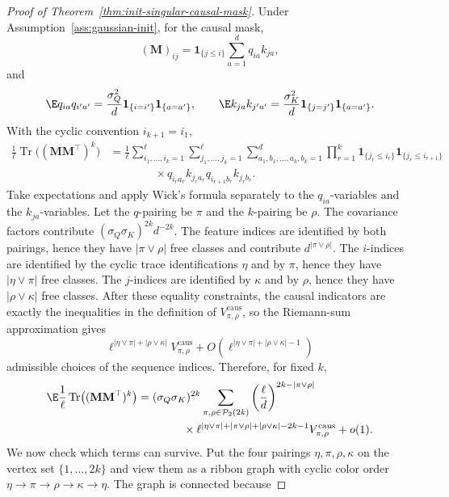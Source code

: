 \documentclass{article}
\newcommand{\one}{\mathbf{1}}
\newcommand{\bM}{\mathbf{M}}
\theoremstyle{definition}
\theoremstyle{remark}
\begin{document}
\begin{proof}[Proof of Theorem~\ref{thm:init-singular-causal-mask}]
Under Assumption~\ref{ass:gaussian-init}, for the causal mask,
\[
    (\bM)_{ij}
    =
    \one_{\{j\leq i\}}\sum_{a=1}^d q_{ia}k_{ja},
\]
and
\[
    \E q_{ia}q_{i'a'}
    =
    \frac{\sigma_Q^2}{d}\one_{\{i=i'\}}\one_{\{a=a'\}},
    \qquad
    \E k_{ja}k_{j'a'}
    =
    \frac{\sigma_K^2}{d}\one_{\{j=j'\}}\one_{\{a=a'\}}.
\]
With the cyclic convention $i_{k+1}=i_1$,
\[
\begin{aligned}
\frac1\ell\operatorname{Tr}\bigl((\bM\bM^\top)^k\bigr)
&=
\frac1\ell
\sum_{i_1,\ldots,i_k=1}^{\ell}
\sum_{j_1,\ldots,j_k=1}^{\ell}
\sum_{a_1,b_1,\ldots,a_k,b_k=1}^{d}
\prod_{r=1}^k
\one_{\{j_r\leq i_r\}}\one_{\{j_r\leq i_{r+1}\}}
\\
&\qquad\qquad\times
q_{i_ra_r}k_{j_ra_r}q_{i_{r+1}b_r}k_{j_rb_r}.
\end{aligned}
\]
Take expectations and apply Wick's formula separately to the $q_{ia}$-variables
and the $k_{ja}$-variables.  Let the $q$-pairing be $\pi$ and the $k$-pairing be
$\rho$.  The covariance factors contribute
$(\sigma_Q\sigma_K)^{2k}d^{-2k}$.  The feature indices are identified by both
pairings, hence they have $|\pi\vee\rho|$ free classes and contribute
$d^{|\pi\vee\rho|}$.  The $i$-indices are identified by the cyclic trace
identifications $\eta$ and by $\pi$, hence they have $|\eta\vee\pi|$ free
classes.  The $j$-indices are identified by $\kappa$ and by $\rho$, hence they
have $|\rho\vee\kappa|$ free classes.  After these equality constraints, the
causal indicators are exactly the inequalities in the definition of
$V_{\pi,\rho}^{\mathrm{caus}}$, so the Riemann-sum approximation gives
\[
    \ell^{|\eta\vee\pi|+|\rho\vee\kappa|}
    V_{\pi,\rho}^{\mathrm{caus}}
    +
    O\left(\ell^{|\eta\vee\pi|+|\rho\vee\kappa|-1}\right)
\]
admissible choices of the sequence indices.  Therefore, for fixed $k$,
\[
\begin{aligned}
\E\frac1\ell\operatorname{Tr}\bigl((\bM\bM^\top)^k\bigr)
&=
(\sigma_Q\sigma_K)^{2k}
\sum_{\pi,\rho\in\mathcal P_2(2k)}
\left(\frac{\ell}{d}\right)^{2k-|\pi\vee\rho|}
\\
&\qquad\qquad\times
\ell^{|\eta\vee\pi|+|\pi\vee\rho|+|\rho\vee\kappa|-2k-1}
V_{\pi,\rho}^{\mathrm{caus}}
+o(1).
\end{aligned}
\]
We now check which terms can survive.  Put the four pairings
$\eta,\pi,\rho,\kappa$ on the vertex set $\{1,\ldots,2k\}$ and view them as a
ribbon graph with cyclic color order
$\eta\to\pi\to\rho\to\kappa\to\eta$.  The graph is connected because

\end{proof}
\end{document}
